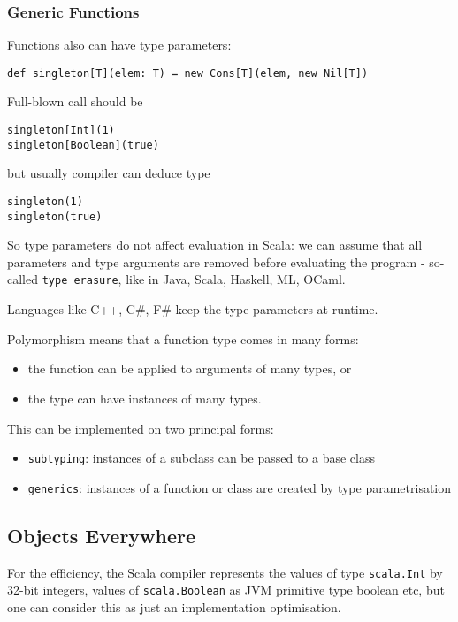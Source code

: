 \documentclass{scrartcl}
\newcommand{\term}[1]{\verb~#1~} %
\begin{document}
\subsubsection{Generic Functions}
\label{sec:GenericFunction}

Functions also can have type parameters:
\begin{lstlisting}
def singleton[T](elem: T) = new Cons[T](elem, new Nil[T])
\end{lstlisting}
Full-blown call should be
\begin{lstlisting}
singleton[Int](1)
singleton[Boolean](true)
\end{lstlisting}
but usually compiler can deduce type
\begin{lstlisting}
singleton(1)
singleton(true)
\end{lstlisting}

So type parameters do not affect evaluation in Scala: we can assume that all
parameters and type arguments are removed before evaluating the program -
so-called \term{type erasure}, like in Java, Scala, Haskell, ML, OCaml.

Languages like C++, C\#, F\# keep the type parameters at runtime.

Polymorphism means that a function type comes in many forms:
\begin{itemize}
\item the function can be applied to arguments of many types, or
\item the type can have instances of many types.
\end{itemize}
This can be implemented on two principal forms:
\begin{itemize}
\item \term{subtyping}: instances of a subclass can be passed to a base class
\item \term{generics}: instances of a function or class are created by type
  parametrisation
\end{itemize}

\subsection{Objects Everywhere}
\label{sec:ObjectsEverywhere}

For the efficiency, the Scala compiler represents the values of type
\lstinline|scala.Int| by 32-bit integers, values of \lstinline|scala.Boolean| as
JVM primitive type boolean etc, but one can consider this as just an
implementation optimisation.
\end{document}

